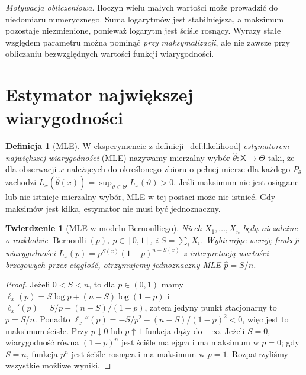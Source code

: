 \documentclass[11pt,a4paper,oneside]{report}
\numberwithin{equation}{chapter}
\theoremstyle{plain}
\newtheorem{twierdzenie}{Twierdzenie}[chapter]
\theoremstyle{definition}
\newtheorem{definicja}{Definicja}[chapter]
\theoremstyle{remark}
\begin{document}
\emph{Motywacja obliczeniowa.} Iloczyn wielu małych wartości może prowadzić
do niedomiaru numerycznego. Suma logarytmów jest stabilniejsza, a maksimum
pozostaje niezmienione, ponieważ logarytm jest ściśle rosnący. Wyrazy
stałe względem parametru można pominąć \emph{przy maksymalizacji}, ale nie
zawsze przy obliczaniu bezwzględnych wartości funkcji wiarygodności.

\section{Estymator największej wiarygodności}
\begin{definicja}[MLE]\label{def:mle}
W eksperymencie z definicji~\ref{def:likelihood} \emph{estymatorem
największej wiarygodności} (MLE) nazywamy mierzalny wybór
$\widehat\theta:\mathsf X\to\Theta$ taki, że dla obserwacji $x$ należących
do określonego zbioru o pełnej mierze dla każdego $P_\theta$ zachodzi
$L_x(\widehat\theta(x))=\sup_{\vartheta\in\Theta}L_x(\vartheta)>0$.
Jeśli maksimum nie jest osiągane lub nie istnieje mierzalny wybór,
MLE w tej postaci może nie istnieć. Gdy maksimów jest kilka, estymator
nie musi być jednoznaczny.
\end{definicja}

\begin{twierdzenie}[MLE w modelu Bernoulliego]\label{thm:mle-bernoulli}
Niech $X_1,\ldots,X_n$ będą niezależne o rozkładzie $\operatorname{Bernoulli}(p)$,
$p\in[0,1]$, i $S=\sum_iX_i$. Wybierając wersję funkcji wiarygodności
$L_x(p)=p^{S(x)}(1-p)^{n-S(x)}$ z interpretacją wartości brzegowych przez
ciągłość, otrzymujemy jednoznaczny MLE $\widehat p=S/n$.
\end{twierdzenie}
\begin{proof}
Jeżeli $0<S<n$, to dla $p\in(0,1)$ mamy
$\ell_x(p)=S\log p+(n-S)\log(1-p)$ i
$\ell_x'(p)=S/p-(n-S)/(1-p)$, zatem jedyny punkt stacjonarny to
$p=S/n$. Ponadto $\ell_x''(p)=-S/p^2-(n-S)/(1-p)^2<0$, więc jest to
maksimum ścisłe. Przy $p\downarrow0$ lub $p\uparrow1$ funkcja dąży do
$-\infty$. Jeżeli $S=0$, wiarygodność równa $(1-p)^n$ jest ściśle malejąca
i ma maksimum w $p=0$; gdy $S=n$, funkcja $p^n$ jest ściśle rosnąca i ma
maksimum w $p=1$. Rozpatrzyliśmy wszystkie możliwe wyniki.
\end{proof}
\end{document}
